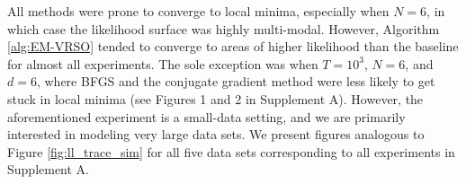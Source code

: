 %
All methods were prone to converge to local minima, especially when $N=6$, in which case the likelihood surface was highly multi-modal. However, Algorithm \ref{alg:EM-VRSO} tended to converge to areas of higher likelihood than the baseline for almost all experiments. The sole exception was when $T=10^3$, $N=6$, and $d=6$, where BFGS and the conjugate gradient method were less likely to get stuck in local minima (see Figures 1 and 2 in Supplement A). However, the aforementioned experiment is a small-data setting, and we are primarily interested in modeling very large data sets. %
%
%
We present figures analogous to Figure \ref{fig:ll_trace_sim} for all five data sets corresponding to all experiments in Supplement A.
%




